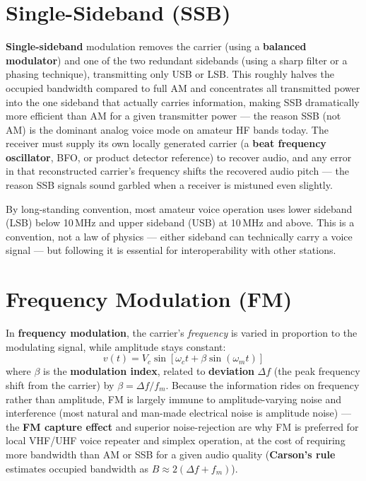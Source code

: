 \section{Single-Sideband (SSB)}

\textbf{Single-sideband} modulation removes the carrier (using a
\textbf{balanced modulator}) and one of the two redundant sidebands
(using a sharp filter or a phasing technique), transmitting only USB or
LSB. This roughly halves the occupied bandwidth compared to full AM and
concentrates all transmitted power into the one sideband that actually
carries information, making SSB dramatically more efficient than AM for
a given transmitter power --- the reason SSB (not AM) is the dominant
analog voice mode on amateur HF bands today. The receiver must supply
its own locally generated carrier (a \textbf{beat frequency oscillator},
BFO, or product detector reference) to recover audio, and any error in
that reconstructed carrier's frequency shifts the recovered audio pitch
--- the reason SSB signals sound garbled when a receiver is mistuned even
slightly.

\begin{examtip}
By long-standing convention, most amateur voice operation uses lower
sideband (LSB) below 10\,MHz and upper sideband (USB) at 10\,MHz and
above. This is a convention, not a law of physics --- either sideband
can technically carry a voice signal --- but following it is essential
for interoperability with other stations.
\end{examtip}

\section{Frequency Modulation (FM)}

In \textbf{frequency modulation}, the carrier's \emph{frequency} is
varied in proportion to the modulating signal, while amplitude stays
constant:
\[
v(t) = V_c\sin\!\left[\omega_c t + \beta\sin(\omega_m t)\right]
\]
where $\beta$ is the \textbf{modulation index}, related to
\textbf{deviation} $\Delta f$ (the peak frequency shift from the carrier)
by $\beta = \Delta f / f_m$. Because the information rides on frequency
rather than amplitude, FM is largely immune to amplitude-varying noise
and interference (most natural and man-made electrical noise is
amplitude noise) --- the \textbf{FM capture effect} and superior
noise-rejection are why FM is preferred for local VHF/UHF voice
repeater and simplex operation, at the cost of requiring more bandwidth
than AM or SSB for a given audio quality (\textbf{Carson's rule}
estimates occupied bandwidth as $B \approx 2(\Delta f + f_m)$).

